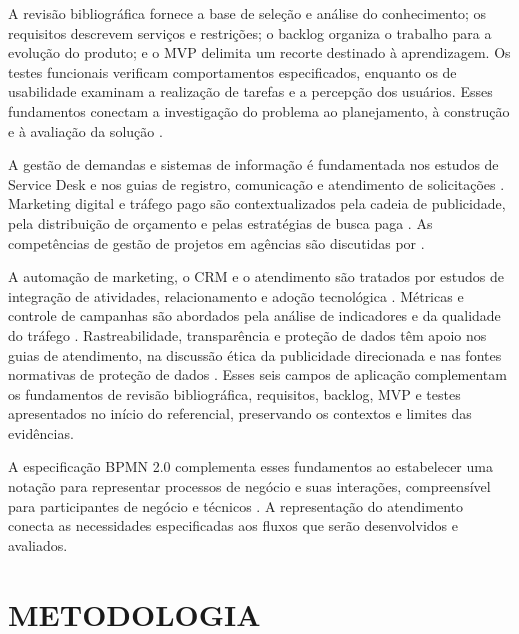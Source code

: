 A revisão bibliográfica fornece a base de seleção e análise do conhecimento; os requisitos descrevem serviços e restrições; o backlog organiza o trabalho para a evolução do produto; e o MVP delimita um recorte destinado à aprendizagem. Os testes funcionais verificam comportamentos especificados, enquanto os de usabilidade examinam a realização de tarefas e a percepção dos usuários. Esses fundamentos conectam a investigação do problema ao planejamento, à construção e à avaliação da solução \cite{GIL_1991,SOMMERVILLE_2011,SCHWABER_SUTHERLAND_2020,CAROLI_2015,MYERS_SANDLER_BADGETT_2012,TEIXEIRA_2014}.

A gestão de demandas e sistemas de informação é fundamentada nos estudos de Service Desk e nos guias de registro, comunicação e atendimento de solicitações \cite{amanullah2017,fenner2015,firmansyah2022,servicedesk2023,servicerequest2020}. Marketing digital e tráfego pago são contextualizados pela cadeia de publicidade, pela distribuição de orçamento e pelas estratégias de busca paga \cite{agus2019,yahia2024,nain2025}. As competências de gestão de projetos em agências são discutidas por .

A automação de marketing, o CRM e o atendimento são tratados por estudos de integração de atividades, relacionamento e adoção tecnológica \cite{gujar2024,younas2025,kharisma2024,emon2026}. Métricas e controle de campanhas são abordados pela análise de indicadores e da qualidade do tráfego \cite{nain2025,abbonizio2023}. Rastreabilidade, transparência e proteção de dados têm apoio nos guias de atendimento, na discussão ética da publicidade direcionada e nas fontes normativas de proteção de dados \cite{servicedesk2023,servicerequest2020,daoud2023,brasil2018,anpd2021}. Esses seis campos de aplicação complementam os fundamentos de revisão bibliográfica, requisitos, backlog, MVP e testes apresentados no início do referencial, preservando os contextos e limites das evidências.

A especificação BPMN 2.0 complementa esses fundamentos ao estabelecer uma notação para representar processos de negócio e suas interações, compreensível para participantes de negócio e técnicos \cite{omg2011}. A representação do atendimento conecta as necessidades especificadas aos fluxos que serão desenvolvidos e avaliados.

\section{\esp METODOLOGIA}

